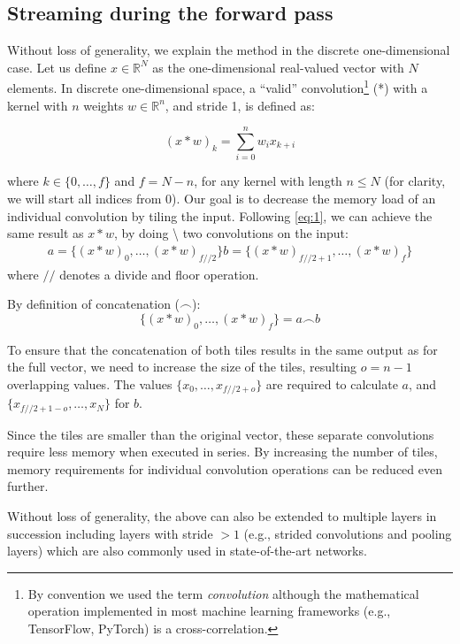 \documentclass[
  12pt,
  a5,margin=2cmpaper,
]{article}
\begin{document}
\hypertarget{forwardpass}{%
\subsection{Streaming during the forward pass}\label{forwardpass}}

Without loss of generality, we explain the method in the discrete
one-dimensional case. Let us define \(x \in \mathbb{R}^{N}\) as the
one-dimensional real-valued vector with \(N\) elements. In discrete
one-dimensional space, a ``valid'' convolution\footnote{By convention we
  used the term \emph{convolution} although the mathematical operation
  implemented in most machine learning frameworks (e.g., TensorFlow,
  PyTorch) is a cross-correlation.} (*) with a kernel with \(n\) weights
\(w \in \mathbb{R}^n\), and stride 1, is defined as:

\[\label{eq:1}
(x * w)_k = \sum_{i=0}^{n} w_{i}x_{k+i}\]

where \(k \in \{0,\ldots,f\}\) and \(f=N - n\), for any kernel with
length \(n \leq N\) (for clarity, we will start all indices from 0). Our
goal is to decrease the memory load of an individual convolution by
tiling the input. Following \protect\hyperlink{eq:1}{{[}eq:1{]}}, we can
achieve the same result as \(x * w\), by doing \textbackslash{} two
convolutions on the input: \[\begin{gathered}
a = \{(x * w)_0,\ldots,(x * w)_{f//2}\} 
b = \{(x * w)_{f//2+1},\ldots,(x * w)_f\} \label{eq:3}
\end{gathered}\] where \(//\) denotes a divide and floor operation.

By definition of concatenation (\(\frown\)): \[\label{eq:4}
\{(x * w)_0,\ldots,(x * w)_f\}= a \frown b\]

To ensure that the concatenation of both tiles results in the same
output as for the full vector, we need to increase the size of the
tiles, resulting \(o=n-1\) overlapping values. The values
\(\{ x_0,\ldots,x_{f//2+o} \}\) are required to calculate \(a\), and
\(\{ x_{f//2+1-o},\ldots,x_N \}\) for \(b\).

Since the tiles are smaller than the original vector, these separate
convolutions require less memory when executed in series. By increasing
the number of tiles, memory requirements for individual convolution
operations can be reduced even further.

Without loss of generality, the above can also be extended to multiple
layers in succession including layers with stride \(> 1\) (e.g., strided
convolutions and pooling layers) which are also commonly used in
state-of-the-art networks.
\end{document}
